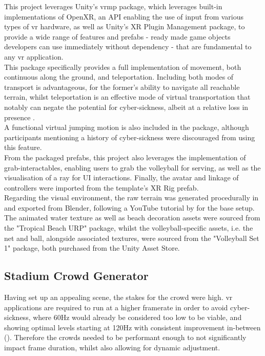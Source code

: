 This project leverages Unity's \gls{vrmp} package, which leverages built-in implementations of OpenXR, an API enabling the use of input from various types of \gls{vr} hardware, as well as Unity's XR Plugin Management package, to provide a wide range of features and prefabs - ready made game objects developers can use immediately without dependency - that are fundamental to any \gls{vr} application.\\
This package specifically provides a full implementation of movement, both continuous along the ground, and teleportation. Including both modes of transport is advantageous, for the former's ability to navigate all reachable terrain, whilst teleportation is an effective mode of virtual transportation that notably can negate the potential for cyber-sickness, albeit at a relative loss in presence \cite{caputo-2023-eyes}. \\
A functional virtual jumping motion is also included in the package, although participants mentioning a history of cyber-sickness were discouraged from using this feature.\\
From the packaged prefabs, this project also leverages the implementation of grab-interactables, enabling users to grab the volleyball for serving, as well as the visualisation of a ray for UI interactions. Finally, the avatar and linkage of controllers were imported from the template's XR Rig prefab.\\

Regarding the visual environment, the raw terrain was generated procedurally in and exported from Blender, following a YouTube tutorial by \cite{procedural_terrain_blender} for the base setup. The animated water texture as well as beach decoration assets were sourced from the "Tropical Beach URP" \cite{tropical_beach_assets} package, whilst the volleyball-specific assets, i.e. the net and ball, alongside associated textures, were sourced from the "Volleyball Set 1" \cite{volleyball_assets} package, both purchased from the Unity Asset Store.\\

\subsection{Stadium Crowd Generator}

Having set up an appealing scene, the stakes for the crowd were high. \gls{vr} applications are required to run at a higher framerate in order to avoid cyber-sickness, where 60Hz would already be considered too low to be viable, and showing optimal levels starting at 120Hz with consistent improvement in-between  (\cite{wang2023effect}). Therefore the crowds needed to be performant enough to not significantly impact frame duration, whilst also allowing for dynamic adjustment.\\

